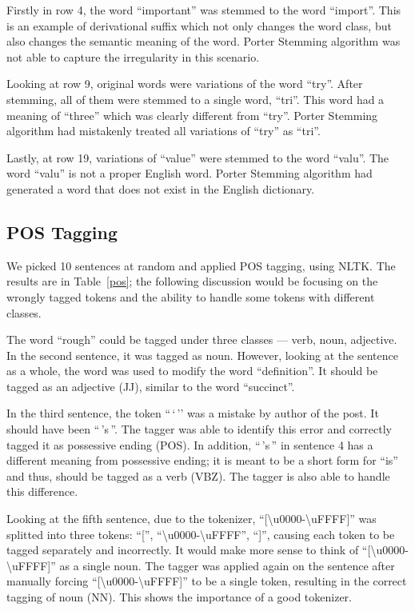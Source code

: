 Firstly in row 4, the word ``important'' was stemmed to the word ``import''.
This is an example of derivational suffix which not only changes the word class,
but also changes the semantic meaning of the word. Porter Stemming algorithm was
not able to capture the irregularity in this scenario. 

Looking at row 9, original words were variations of the word ``try''. After
stemming, all of them were stemmed to a single word, ``tri''. This word had a
meaning of ``three'' which was clearly different from ``try''. Porter Stemming
algorithm had mistakenly treated all variations of ``try'' as ``tri''.

Lastly, at row 19, variations of ``value'' were stemmed to the word ``valu''.
The word ``valu'' is not a proper English word. Porter Stemming algorithm had
generated a word that does not exist in the English dictionary.

\subsection{POS Tagging}

We picked 10 sentences at random and applied POS tagging, using NLTK\@.
The results are in Table~\ref{pos}; the following discussion would be
focusing on the wrongly tagged tokens and the ability to handle some
tokens with different classes.

The word ``rough'' could be tagged under three classes --- verb, noun,
adjective. In the second sentence, it was tagged as noun. However, looking at
the sentence as a whole, the word was used to modify the word ``definition''.
It should be tagged as an adjective (JJ), similar to the word ``succinct''.

In the third sentence, the token ``\,`\,'' was a mistake by author of the post. It
should have been ``\,'s\,''. The tagger was able to identify this error and
correctly tagged it as possessive ending (POS). In addition, ``\,'s\,'' in sentence
4 has a different meaning from possessive ending; it is meant to be a short
form for ``is'' and thus, should be tagged as a verb (VBZ). The tagger is also
able to handle this difference.

Looking at the fifth sentence, due to the tokenizer,
``{[}\textbackslash{}u0000-\textbackslash{}uFFFF{]}'' was splitted into
three tokens: ``['',
``\textbackslash{}u0000-\textbackslash{}uFFFF'', ``]'', causing each token to
be tagged separately and incorrectly. It would make more sense to think of
``{[}\textbackslash{}u0000-\textbackslash{}uFFFF{]}'' as a single noun.
The tagger was applied again on the sentence after manually forcing
``{[}\textbackslash{}u0000-\textbackslash{}uFFFF{]}'' to be a single token,
resulting in the correct tagging of noun (NN). This shows the importance of a
good tokenizer.

